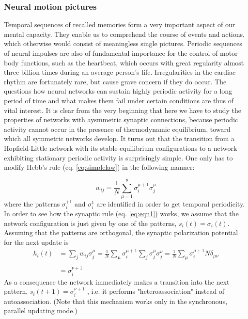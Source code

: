 \subsubsection{Neural motion pictures}\label{sec:Neuralmotionpictures}
Temporal sequences of recalled memories form a very important aspect of our mental capacity. They enable us to comprehend the course of events and actions, which otherwise would consist of meaningless single pictures. Periodic sequences of neural impulses are also of fundamental importance for the control of motor body functions, such as the heartbeat, which occurs with great regularity almost three billion times during an average person's life. Irregularities in the cardiac rhythm are fortunately rare, but cause grave concern if they do occur. The questions how neural networks can sustain highly periodic activity for a long period of time and what makes them fail under certain conditions are thus of vital interest. 
It is clear from the very beginning that here we have to study the properties of networks with aysmmetric synaptic connections, because periodic activity cannot occur in the presence of thermodynamic equilibrium, toward which all symmetric networks develop. It turns out that the transition from a Hopfield-Little network with its stable-equilibrium configurations to a network exhibiting stationary periodic activity is surprisingly simple. One only has to modify Hebb's rule (eq. \ref{eq:simplelaw}) in the following manner:


\begin{equation}
   w_{ij}=\frac{1}{N}\sum_{\mu=1}^{p}\sigma^{\mu+1}_{i}\sigma^{\mu}_{j}
   \label{eq:eqn1}
\end{equation}
where the patterns $\sigma^{+1}_{i}$ and $\sigma^{1}_{i}$ are identified in order to get temporal periodicity. In order to see how the synaptic rule (eq. \ref{eq:eqn1}) works, we assume that the network configuration is just given by one of the patterns, $s_i(t) = \sigma_{i}(t)$. Assuming that the patterns are orthogonal, the synaptic polarization potential for the next update is
\begin{equation}
    \begin{split}
        h_{i}(t)&=\sum_{j}w_{ij}\sigma^{\mu}_{j}=\frac{1}{N}\sum_{\mu}\sigma^{\mu+1}_{i}\sum_{j}\sigma^{\mu}_{j}\sigma^{\nu}_{j}=\frac{1}{N}\sum_{\mu}\sigma^{\mu+1}_{i}N\delta_{\mu \nu}\\
        \\&=\sigma^{\nu+1}_{i}
    \end{split}
\end{equation}
As a consequence the network immediately makes a transition into the next pattern, $s_i(t + 1) = \sigma^{\nu+1}_{i}$ , i.e. it performs "heteroassociation" instead of autoassociation. (Note that this mechanism works only in the synchronous, parallel updating mode.)


